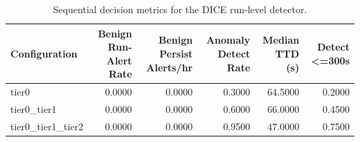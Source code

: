 \begin{table}[t]
\centering
\caption{Sequential decision metrics for the DICE run-level detector.}
\label{tab:dice_sequential_metrics}
\footnotesize
\begin{tabular}{lrrrrr}
\toprule
Configuration & Benign Run-Alert Rate & Benign Persist Alerts/hr & Anomaly Detect Rate & Median TTD (s) & Detect <=300s \\
\midrule
tier0 & 0.0000 & 0.0000 & 0.3000 & 64.5000 & 0.2000 \\
tier0_tier1 & 0.0000 & 0.0000 & 0.6000 & 66.0000 & 0.4500 \\
tier0_tier1_tier2 & 0.0000 & 0.0000 & 0.9500 & 47.0000 & 0.7500 \\
\bottomrule
\end{tabular}

\end{table}
